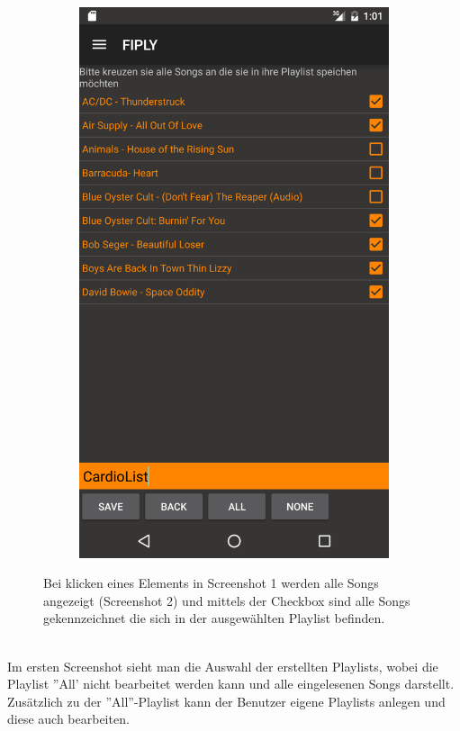 \documentclass[FIPLY_base.tex]{subfiles}
\begin{document}
\begin{figure}[h]
\begin{subfigure}[b]{0.3\textwidth}
	\includegraphics[scale=0.15]{img/musicSongView1}
	\end{subfigure}
	\caption{Bei klicken eines Elements in Screenshot 1 werden alle Songs angezeigt (Screenshot 2) und mittels der Checkbox sind alle Songs gekennzeichnet die sich in der ausgewählten Playlist befinden.}
\end{figure}

\ \\
Im ersten Screenshot sieht man die Auswahl der erstellten Playlists, wobei die Playlist ''All' nicht bearbeitet werden kann und alle eingelesenen Songs darstellt.
Zusätzlich zu der ''All''-Playlist kann der Benutzer eigene Playlists anlegen und diese auch bearbeiten.
\end{document}
